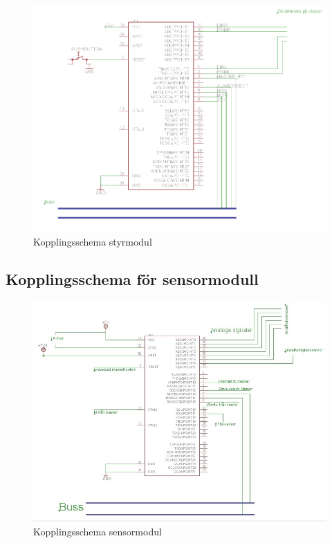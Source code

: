 \documentclass[a4paper,12pt,fleqn]{article}
\begin{document}
\begin{figure}[ht] %
  \begin{center}
  \includegraphics[keepaspectratio=true,width=\linewidth]{kopplingsschema_styrmodul.png}  %
  \end{center}
  \caption{Kopplingsschema styrmodul} %
  \label{fig:kopplingstyr} %
\end{figure}
 \clearpage %
 

\subsection{Kopplingsschema för sensormodull}

\begin{figure}[ht] %
  \begin{center}
  \includegraphics[keepaspectratio=true,width=\linewidth]{sensormodulkoppling.jpg}  %
  \end{center}
  \caption{Kopplingsschema sensormodul} %
  \label{fig:kopplingsensor} %
\end{figure}
 \clearpage %
 
\end{document}
